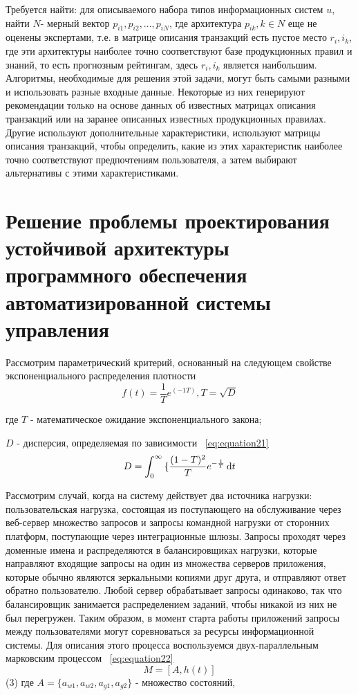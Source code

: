Требуется найти: для описываемого набора типов информационных систем $u$, найти $N $- мерный вектор $p_{i1},p_{i2},...,p_{iN}$, где архитектура $p_{ik},k\in N$  еще не оценены экспертами, т.е. в матрице описания транзакций есть пустое место $r_i,i_k$, где эти архитектуры наиболее точно соответствуют базе продукционных правил и знаний, то есть прогнозным рейтингам, здесь $r_i,i_k$ является наибольшим. Алгоритмы, необходимые для решения этой задачи, могут быть самыми разными и использовать разные входные данные. Некоторые из них генерируют рекомендации только на основе данных об известных матрицах описания транзакций или на заранее описанных известных продукционных правилах. Другие используют дополнительные характеристики, используют матрицы описания транзакций, чтобы определить, какие из этих характеристик наиболее точно соответствуют предпочтениям пользователя, а затем выбирают альтернативы с этими характеристиками.

\section{Решение проблемы проектирования устойчивой архитектуры программного обеспечения автоматизированной системы управления}\label{sec:ch2/sec3}

Рассмотрим параметрический критерий, основанный на следующем свойстве экспоненциального распределения плотности 
\begin{equation}
    \label{eq:equation20}
    f(t) = \frac{1}{T}e^{(-1T)}, T = \sqrt{D}  
\end{equation}

где $T$ - математическое ожидание экспоненциального закона;

$D$ - дисперсия, определяемая по зависимости ~\cref{eq:equation21}
\begin{equation}
    \label{eq:equation21}
    D = \int_0^{\infty} \mathrm \{\frac{(1-T)^2}{T}e^{-\frac{1}{T}}\,\mathrm{d}t    
\end{equation}

Рассмотрим случай, когда на систему действует два источника нагрузки: пользовательская нагрузка, состоящая из поступающего на обслуживание через веб-сервер множество запросов и запросы командной нагрузки от сторонних платформ, поступающие через интеграционные шлюзы. Запросы проходят через доменные имена и распределяются в балансировщиках нагрузки, которые направляют входящие запросы на один из множества серверов приложения, которые обычно являются зеркальными копиями друг друга, и отправляют ответ обратно пользователю. Любой сервер обрабатывает запросы одинаково, так что балансировщик занимается распределением заданий, чтобы никакой из них не был перегружен.
Таким образом, в момент старта работы приложений запросы между пользователями могут соревноваться за ресурсы информационной системы. Для описания этого процесса воспользуемся двух-параллельным марковским процессом ~\cref{eq:equation22}
\begin{equation}
    \label{eq:equation22}
    M = [A, h(t)]  
\end{equation}
                       (3)
где $ A = \{a_{w1},a_{w2}, a_{g1},a_{g2} \}$ - множество состояний, 


